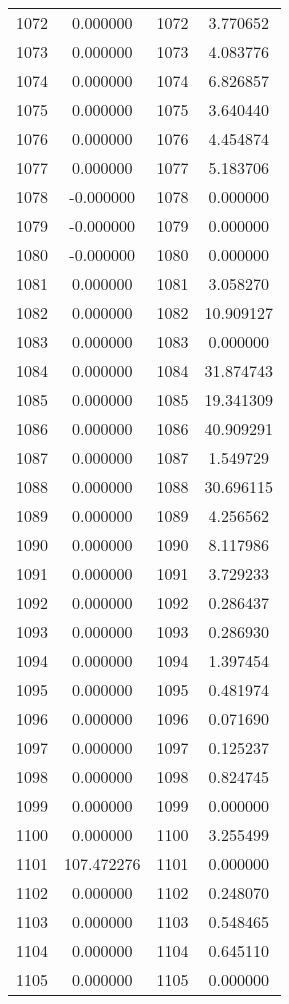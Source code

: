 \documentclass[12pt]{article}
\begin{document}
\begin{longtable}{@{}cccc@{}}
1072 & 0.000000 & 1072 & 3.770652 \\
1073 & 0.000000 & 1073 & 4.083776 \\
1074 & 0.000000 & 1074 & 6.826857 \\
1075 & 0.000000 & 1075 & 3.640440 \\
1076 & 0.000000 & 1076 & 4.454874 \\
1077 & 0.000000 & 1077 & 5.183706 \\
1078 & -0.000000 & 1078 & 0.000000 \\
1079 & -0.000000 & 1079 & 0.000000 \\
1080 & -0.000000 & 1080 & 0.000000 \\
1081 & 0.000000 & 1081 & 3.058270 \\
1082 & 0.000000 & 1082 & 10.909127 \\
1083 & 0.000000 & 1083 & 0.000000 \\
1084 & 0.000000 & 1084 & 31.874743 \\
1085 & 0.000000 & 1085 & 19.341309 \\
1086 & 0.000000 & 1086 & 40.909291 \\
1087 & 0.000000 & 1087 & 1.549729 \\
1088 & 0.000000 & 1088 & 30.696115 \\
1089 & 0.000000 & 1089 & 4.256562 \\
1090 & 0.000000 & 1090 & 8.117986 \\
1091 & 0.000000 & 1091 & 3.729233 \\
1092 & 0.000000 & 1092 & 0.286437 \\
1093 & 0.000000 & 1093 & 0.286930 \\
1094 & 0.000000 & 1094 & 1.397454 \\
1095 & 0.000000 & 1095 & 0.481974 \\
1096 & 0.000000 & 1096 & 0.071690 \\
1097 & 0.000000 & 1097 & 0.125237 \\
1098 & 0.000000 & 1098 & 0.824745 \\
1099 & 0.000000 & 1099 & 0.000000 \\
1100 & 0.000000 & 1100 & 3.255499 \\
1101 & 107.472276 & 1101 & 0.000000 \\
1102 & 0.000000 & 1102 & 0.248070 \\
1103 & 0.000000 & 1103 & 0.548465 \\
1104 & 0.000000 & 1104 & 0.645110 \\
1105 & 0.000000 & 1105 & 0.000000 \\

\end{longtable}
\end{document}
